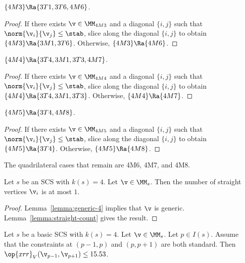 \begin{lemma}[]
$\{4M3\}\Ra\{3T1,3T6,4M6\}$.
\end{lemma}

\begin{proof}
If there exists $\v\in \MM_{4M3}$ and a diagonal $\{i,j\}$ such that $\norm{\v_i}{\v_j}\le \stab$,
slice along the diagonal $\{i,j\}$ to obtain 
 $\{4M3\}\Ra \{3M1,3T6\}$.
Otherwise, $\{4M3\}\Ra\{4M6\}$.
\end{proof}

\begin{lemma}[]
$\{4M4\}\Ra\{3T4,3M1,3T3,4M7\}$.
\end{lemma}

\begin{proof}
If there exists $\v\in \MM_{4M4}$ and a diagonal $\{i,j\}$ such that $\norm{\v_i}{\v_j}\le \stab$,
slice along the diagonal $\{i,j\}$ to obtain 
 $\{4M4\}\Ra \{3T4,3M1,3T3\}$.
Otherwise, $\{4M4\}\Ra\{4M7\}$.
\end{proof}

\begin{lemma}[]
$\{4M5\}\Ra\{3T4,4M8\}$.
\end{lemma}

\begin{proof}
If there exists $\v\in \MM_{4M5}$ and a diagonal $\{i,j\}$ such that $\norm{\v_i}{\v_j}\le \stab$,
slice along the diagonal $\{i,j\}$ to obtain 
 $\{4M5\}\Ra \{3T4\}$.
Otherwise, $\{4M5\}\Ra\{4M8\}$.
\end{proof}

The quadrilateral cases that remain are 4M6, 4M7, and 4M8.


\begin{lemma}[]
Let $s$ be an SCS with $k(s)=4$.
Let $\v\in \MM_s$.  Then the number of straight vertices $\v_i$ is at most $1$.
\end{lemma}

\begin{proof}
Lemma~\ref{lemma:generic-4} implies that $\v$ is generic. Lemma~\ref{lemma:straight-count} gives the result.
\end{proof}

\begin{lemma}[]\label{lemma:15.53}
Let $s$ be a basic SCS with $k(s)=4$.
Let $\v\in \MM_s$.  
Let  $p\in I(s)$.
Assume that the constraints at $(p-1,p)$ and $(p,p+1)$ are both standard.  Then
$\op{xrr}_V(\v_{p-1},\v_{p+1}) \le 15.53$.
\end{lemma}

